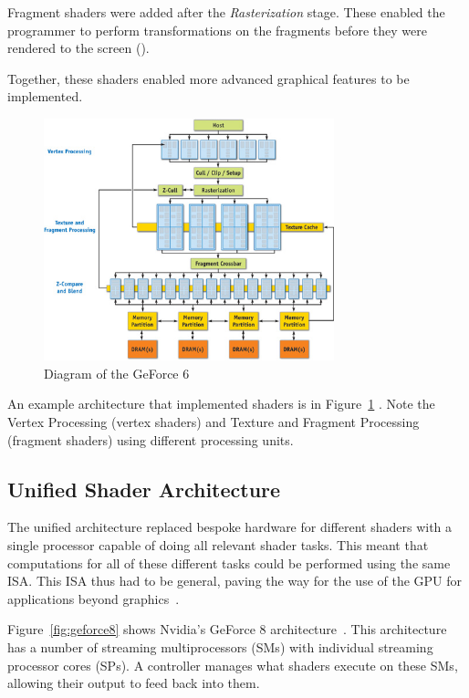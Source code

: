 Fragment shaders were added after the \textit{Rasterization} stage.
These enabled the programmer to perform transformations on the fragments
before they were rendered to the screen (\cite{lsu}).

Together, these shaders enabled more advanced graphical features to
be implemented.

\begin{figure}[h]
    \centering
    \includegraphics[width=0.75\textwidth]{assets/30_geforce6_03.jpg}
    \caption{Diagram of the GeForce 6 }
    \label{fig:geforce6}
\end{figure}

An example architecture that implemented shaders is in Figure~\ref{fig:geforce6} \cite{nvidiaChapterGeForce}.
Note the Vertex Processing (vertex shaders) and Texture and Fragment Processing
(fragment shaders) using different processing units.

\subsection{Unified Shader Architecture}

The unified architecture replaced bespoke hardware for different shaders with
a single processor capable of doing all relevant shader tasks.
This meant that computations for all of these different tasks could be performed
using the same ISA. This ISA thus had to be general, paving the way for
the use of the GPU for applications beyond graphics~\cite{parojModernUnification}.

Figure~\ref{fig:geforce8} shows Nvidia's GeForce 8 architecture~\cite{mcclanahan2010history}. This architecture
has a number of streaming multiprocessors (SMs) with individual streaming processor cores
(SPs). A controller manages what shaders execute on these SMs, allowing their output
to feed back into them.

